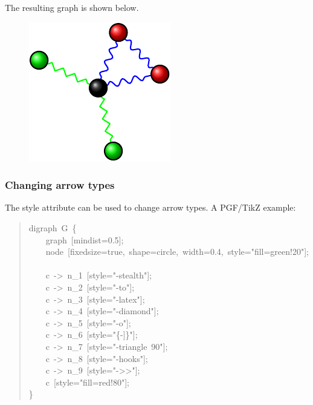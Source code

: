 \documentclass[10pt,a4paper,english]{article}
\newlength{\admonitionwidth}
\begin{document}
The resulting graph is shown below.
\begin{figure}[H]
\centering

\includegraphics{pdf/balls}
\end{figure}
\begin{center}\begin{sffamily}
\end{sffamily}
\end{center}



\hypertarget{changing-arrow-types}{}
\subsubsection*{Changing arrow types}
\label{changing-arrow-types}

The style attribute can be used to change arrow types. A PGF/TikZ example:
\begin{quote}{\ttfamily \raggedright \noindent
digraph~G~{\{}~\\
~~~~graph~{[}mindist=0.5{]};~\\
~~~~node~{[}fixedsize=true,~shape=circle,~width=0.4,~style="fill=green!20"{]};~\\
~~~~c~->~n{\_}1~{[}style="-stealth"{]};~\\
~~~~c~->~n{\_}2~{[}style="-to"{]};~\\
~~~~c~->~n{\_}3~{[}style="-latex"{]};~\\
~~~~c~->~n{\_}4~{[}style="-diamond"{]};~\\
~~~~c~->~n{\_}5~{[}style="-o"{]};~\\
~~~~c~->~n{\_}6~{[}style="{\{}-{]}{\}}"{]};~\\
~~~~c~->~n{\_}7~{[}style="-triangle~90"{]};~\\
~~~~c~->~n{\_}8~{[}style="-hooks"{]};~\\
~~~~c~->~n{\_}9~{[}style="->{}>"{]};~\\
~~~~c~{[}style="fill=red!80"{]};~\\
{\}}
}\end{quote}
\end{document}
